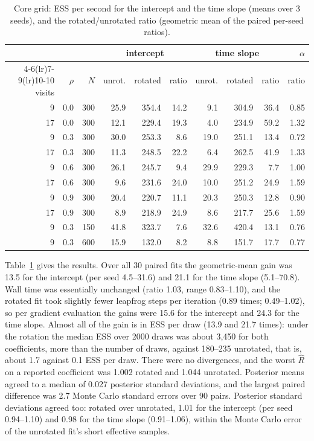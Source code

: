 \begin{table}[t]
\centering
\caption{Core grid: ESS per second for the intercept and the time slope
(means over 3 seeds), and the rotated/unrotated ratio (geometric mean of
the paired per-seed ratios).}
\label{tab:core}
\small
\begin{tabular}{rrr rrr rrr r}
\toprule
& & & \multicolumn{3}{c}{intercept} & \multicolumn{3}{c}{time slope} & $\alpha$ \\
\cmidrule(lr){4-6}\cmidrule(lr){7-9}\cmidrule(lr){10-10}
visits & $\rho$ & $N$ & unrot. & rotated & ratio & unrot. & rotated & ratio & ratio \\
\midrule
9  & 0.0 & 300 & 25.9 & 354.4 & 14.2 &  9.1 & 304.9 & 36.4 & 0.85 \\
17 & 0.0 & 300 & 12.1 & 229.4 & 19.3 &  4.0 & 234.9 & 59.2 & 1.32 \\
9  & 0.3 & 300 & 30.0 & 253.3 &  8.6 & 19.0 & 251.1 & 13.4 & 0.72 \\
17 & 0.3 & 300 & 11.3 & 248.5 & 22.2 &  6.4 & 262.5 & 41.9 & 1.33 \\
9  & 0.6 & 300 & 26.1 & 245.7 &  9.4 & 29.9 & 229.3 &  7.7 & 1.00 \\
17 & 0.6 & 300 &  9.6 & 231.6 & 24.0 & 10.0 & 251.2 & 24.9 & 1.59 \\
9  & 0.9 & 300 & 20.4 & 220.7 & 11.1 & 20.3 & 250.3 & 12.8 & 0.90 \\
17 & 0.9 & 300 &  8.9 & 218.9 & 24.9 &  8.6 & 217.7 & 25.6 & 1.59 \\
9  & 0.3 & 150 & 41.8 & 323.7 &  7.6 & 32.6 & 420.4 & 13.1 & 0.76 \\
9  & 0.3 & 600 & 15.9 & 132.0 &  8.2 &  8.8 & 151.7 & 17.7 & 0.77 \\
\bottomrule
\end{tabular}
\end{table}

Table~\ref{tab:core} gives the results. Over all 30 paired fits the
geometric-mean gain was 13.5 for the intercept (per seed 4.5--31.6) and
21.1 for the time slope (5.1--70.8). Wall time was essentially unchanged
(ratio 1.03, range 0.83--1.10), and the rotated fit took slightly fewer
leapfrog steps per iteration (0.89 times; 0.49--1.02), so per gradient
evaluation the gains were 15.6 for the intercept and 24.3 for the time
slope. Almost all of the gain is in ESS per draw (13.9 and 21.7 times):
under the rotation the median ESS over 2000 draws was about 3,450 for
both coefficients, more than the number of draws, against 180--235
unrotated, that is, about 1.7 against 0.1 ESS per draw. There were no divergences, and the worst $\hat R$ on a reported
coefficient was 1.002 rotated and 1.044 unrotated. Posterior means agreed to a median of 0.027 posterior standard deviations, and the largest paired difference was 2.7 Monte Carlo standard errors over 90 pairs. Posterior standard deviations agreed too: rotated over unrotated, 1.01 for
the intercept (per seed 0.94--1.10) and 0.98 for the time slope
(0.91--1.06), within the Monte Carlo error of the unrotated fit's short
effective samples.


